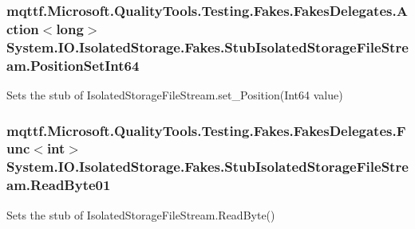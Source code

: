 \hypertarget{class_system_1_1_i_o_1_1_isolated_storage_1_1_fakes_1_1_stub_isolated_storage_file_stream_a1065fba15d662998089ccf41adcb74fb}{
\subsubsection[{Position\-Set\-Int64}]{\setlength{\rightskip}{0pt plus 5cm}mqttf.\-Microsoft.\-Quality\-Tools.\-Testing.\-Fakes.\-Fakes\-Delegates.\-Action$<$long$>$ System.\-I\-O.\-Isolated\-Storage.\-Fakes.\-Stub\-Isolated\-Storage\-File\-Stream.\-Position\-Set\-Int64}}\label{class_system_1_1_i_o_1_1_isolated_storage_1_1_fakes_1_1_stub_isolated_storage_file_stream_a1065fba15d662998089ccf41adcb74fb}


Sets the stub of Isolated\-Storage\-File\-Stream.\-set\-\_\-\-Position(\-Int64 value)

\hypertarget{class_system_1_1_i_o_1_1_isolated_storage_1_1_fakes_1_1_stub_isolated_storage_file_stream_a691c227e7a8fb3c85f7552fce7de2e99}{
\subsubsection[{Read\-Byte01}]{\setlength{\rightskip}{0pt plus 5cm}mqttf.\-Microsoft.\-Quality\-Tools.\-Testing.\-Fakes.\-Fakes\-Delegates.\-Func$<$int$>$ System.\-I\-O.\-Isolated\-Storage.\-Fakes.\-Stub\-Isolated\-Storage\-File\-Stream.\-Read\-Byte01}}\label{class_system_1_1_i_o_1_1_isolated_storage_1_1_fakes_1_1_stub_isolated_storage_file_stream_a691c227e7a8fb3c85f7552fce7de2e99}


Sets the stub of Isolated\-Storage\-File\-Stream.\-Read\-Byte()

